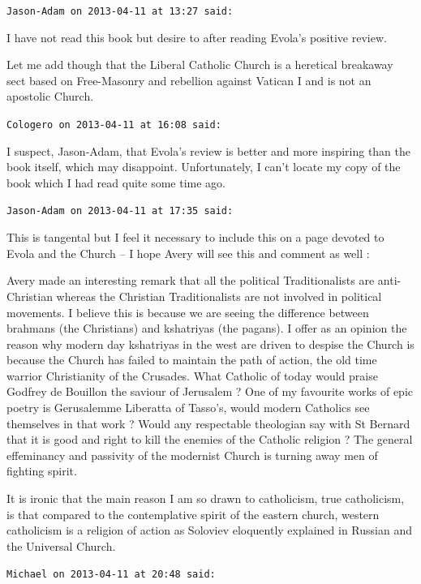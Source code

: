 \begin{footnotesize}
\begin{sffamily}
\texttt{Jason-Adam on 2013-04-11 at 13:27 said:}

I have not read this book but desire to after reading Evola's positive review.

Let me add though that the Liberal Catholic Church is a heretical breakaway sect based on Free-Masonry and rebellion against Vatican I and is not an apostolic Church.

\hfill

\texttt{Cologero on 2013-04-11 at 16:08 said:}

I suspect, Jason-Adam, that Evola's review is better and more inspiring than the book itself, which may disappoint. Unfortunately, I can't locate my copy of the book which I had read quite some time ago.

\hfill

\texttt{Jason-Adam on 2013-04-11 at 17:35 said:}

This is tangental but I feel it necessary to include this on a page devoted to Evola and the Church -- I hope Avery will see this and comment as well :

Avery made an interesting remark that all the political Traditionalists are anti-Christian whereas the Christian Traditionalists are not involved in political movements. I believe this is because we are seeing the difference between brahmans (the Christians) and kshatriyas (the pagans). I offer as an opinion the reason why modern day kshatriyas in the west are driven to despise the Church is because the Church has failed to maintain the path of action, the old time warrior Christianity of the Crusades. What Catholic of today would praise Godfrey de Bouillon the saviour of Jerusalem ? One of my favourite works of epic poetry is Gerusalemme Liberatta of Tasso's, would modern Catholics see themselves in that work ? Would any respectable theologian say with St Bernard that it is good and right to kill the enemies of the Catholic religion ? The general effeminancy and passivity of the modernist Church is turning away men of fighting spirit.

It is ironic that the main reason I am so drawn to catholicism, true catholicism, is that compared to the contemplative spirit of the eastern church, western catholicism is a religion of action as Soloviev eloquently explained in Russian and the Universal Church.

\hfill

\texttt{Michael on 2013-04-11 at 20:48 said:}


\end{sffamily}
\end{footnotesize}
